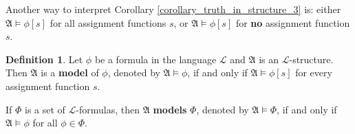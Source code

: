 \documentclass[11pt,letterpaper]{book}
\theoremstyle{definition}
\newtheorem{definition}{Definition}[section]
\begin{document}
Another way to interpret Corollary \ref{corollary_truth_in_structure_3}
is: either $\mathfrak{A}\models \phi[s]$ for all assignment functions
$s$, or $\mathfrak{A} \models \phi[s]$ for \textbf{no} assignment
function $s$.


\begin{definition}\label{def:model_by_assignment}
Let $\phi$ be a formula in the language $\mathcal{L}$ and $\mathfrak{A}$
is an $\mathcal{L}$-structure. Then $\mathfrak{A}$ is a \textbf{model}
of $\phi$, denoted by $\mathfrak{A} \models \phi$, if and only if
$\mathfrak{A} \models \phi[s]$ for every assignment function $s$.

If $\Phi$ is a set of $\mathcal{L}$-formulas, then $\mathfrak{A}$
\textbf{models} $\Phi$, denoted by $\mathfrak{A}\models \Phi$, if and
only if $\mathfrak{A} \models \phi$ for all $\phi \in \Phi$.
\end{definition}
\end{document}
